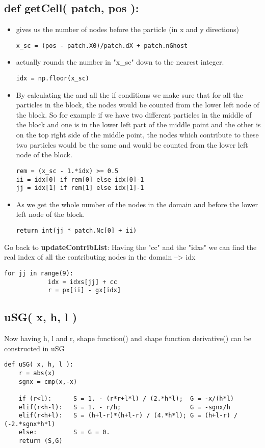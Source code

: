 \subsection{def getCell( patch, pos ):}
\begin{itemize}
\item {} gives us the number of nodes before the particle (in x and y directions)
\begin{lstlisting}
x_sc = (pos - patch.X0)/patch.dX + patch.nGhost
\end{lstlisting}
\item {} actually rounds the number in "x\_sc" down to the nearest integer.
\begin{lstlisting}
idx = np.floor(x_sc)
\end{lstlisting}
\item By calculating the  and all the if conditions we make sure that for all the particles in the block, the nodes would be counted from the lower left node of the block. So for example if we have two different particles in the middle of the block and one is in the lower left part of the middle point and the other is on the top right side of the middle point, the nodes which contribute to these two particles would be the same and would be counted from the lower left node of the block.
\begin{lstlisting}
rem = (x_sc - 1.*idx) >= 0.5
ii = idx[0] if rem[0] else idx[0]-1
jj = idx[1] if rem[1] else idx[1]-1
\end{lstlisting}

\item As  we get the whole number of the nodes in the domain and before the lower left node of the block.
\begin{lstlisting}
return int(jj * patch.Nc[0] + ii)
\end{lstlisting}
\end{itemize}
Go back to \textbf{updateContribList}:
Having the "cc" and the "idxs" we can find the real index of all the contributing nodes in the domain --> idx
\begin{lstlisting}
for jj in range(9):	
            idx = idxs[jj] + cc 
            r = px[ii] - gx[idx]
\end{lstlisting}
\subsection{uSG( x, h, l )}
Now having h, l and r, shape function() and shape function derivative() can be constructed in uSG 
\begin{lstlisting}
def uSG( x, h, l ):
    r = abs(x)
    sgnx = cmp(x,-x)
	
    if (r<l):      S = 1. - (r*r+l*l) / (2.*h*l);  G = -x/(h*l)
    elif(r<h-l):   S = 1. - r/h;                   G = -sgnx/h
    elif(r<h+l):   S = (h+l-r)*(h+l-r) / (4.*h*l); G = (h+l-r) / (-2.*sgnx*h*l)
    else:          S = G = 0.
    return (S,G)
\end{lstlisting}

